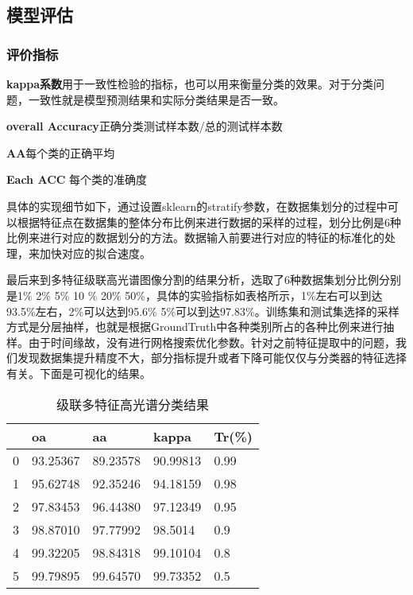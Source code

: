 \documentclass[runningheads]{llncs}
\begin{document}
\subsection{模型评估}
\subsubsection{评价指标}
\qquad \textbf{kappa系数}用于一致性检验的指标，也可以用来衡量分类的效果。对于分类问题，一致性就是模型预测结果和实际分类结果是否一致。


\textbf{overall Accuracy}正确分类测试样本数/总的测试样本数


\textbf{AA}每个类的正确平均


\textbf{Each ACC} 每个类的准确度


具体的实现细节如下，通过设置sklearn的stratify参数，在数据集划分的过程中可以根据特征点在数据集的整体分布比例来进行数据的采样的过程，划分比例是6种比例来进行对应的数据划分的方法。数据输入前要进行对应的特征的标准化的处理，来加快对应的拟合速度。 


最后来到多特征级联高光谱图像分割的结果分析，选取了6种数据集划分比例分别是1\% 2\% 5\% 10 \% 20\% 50\%，具体的实验指标如表格所示，1\%左右可以到达93.5\%左右，2\%可以达到95.6\% 5\%可以到达97.83\%。训练集和测试集选择的采样方式是分层抽样，也就是根据GroundTruth中各种类别所占的各种比例来进行抽样。由于时间缘故，没有进行网格搜索优化参数。针对之前特征提取中的问题，我们发现数据集提升精度不大，部分指标提升或者下降可能仅仅与分类器的特征选择有关。下面是可视化的结果。

\begin{table}[]
\caption{级联多特征高光谱分类结果}
\label{tab:my-table}
\centering
\setlength\tabcolsep{25pt}
\begin{tabular}{lllll}
\toprule
  & oa                & aa                & kappa             & Tr(\%)   \\
  \midrule
0 & 93.25367 & 89.23578 & 90.99813& 0.99 \\
1 & 95.62748 & 92.35246 & 94.18159 & 0.98 \\
2 & 97.83453 & 96.44380  & 97.12349 & 0.95 \\
3 & 98.87010 & 97.77992 & 98.5014 & 0.9  \\
4 & 99.32205 & 98.84318  & 99.10104 & 0.8  \\
5 & 99.79895  & 99.64570& 99.73352 & 0.5 \\
\bottomrule
\end{tabular}

\end{table}
\end{document}
